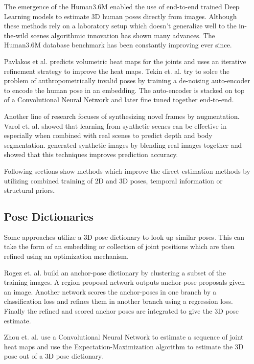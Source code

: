 The emergence of the Human3.6M \parencite{ionescu2014human3} enabled the use of end-to-end trained Deep Learning models to estimate 3D human poses directly from images. Although these methods rely on a laboratory setup which doesn't generalize well to the in-the-wild scenes algorithmic innovation has shown many advances. The Human3.6M database benchmark has been constantly improving ever since.

Pavlakos et al. \parencite{pavlakos2017coarse} predicts volumetric heat maps for the joints and uses an iterative refinement strategy to improve the heat maps. Tekin et. al. \parencite{tekin2016structured} try to solce the problem of anthropometrically invalid poses by training a de-noising auto-encoder to encode the human pose in an embedding. The auto-encoder is stacked on top of a Convolutional Neural Network and later fine tuned together end-to-end.

Another line of research focuses of synthesizing novel frames by augmentation. Varol et. al. \parencite{varol2017learning} showed that learning from synthetic scenes can be effective in especially when combined with real scenes to predict depth and body segmentation. \parencite{rogez2016mocap} generated synthetic images by blending real images  together and showed that this techniques improves prediction accuracy.

Following sections show methods which improve the direct estimation methods by utilizing combined training of 2D and 3D poses, temporal information or structural priors.

\subsection{Pose Dictionaries}

Some approaches utilize a 3D pose dictionary to look up similar poses. This can take the form of an embedding or collection of joint positions which are then refined using an optimization mechanism.

Rogez et. al. \parencite{rogez2017lcr} build an anchor-pose dictionary by clustering a subset of the training images. A region proposal network \parencite{ren2015faster} outputs anchor-pose proposals given an image. Another network scores the anchor-poses in one branch by a classification loss and refines them in another branch using a regression loss. Finally the refined and scored anchor poses are integrated to give the 3D pose estimate.

Zhou et. al. \parencite{zhou2016sparseness} use a Convolutional Neural Network to estimate a sequence of joint heat maps and use the Expectation-Maximization algorithm to estimate the 3D pose out of a 3D pose dictionary. 

